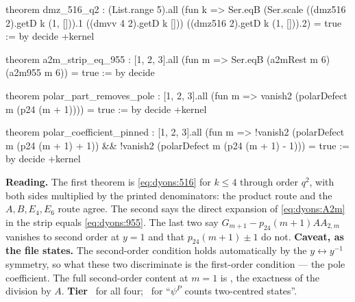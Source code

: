 \begin{leanbox}
\begin{leancode}
theorem dmz_516_q2 :
    (List.range 5).all (fun k =>
      Ser.eqB (Ser.scale ((dmz516 2).getD k (1, [])).1 ((dmvv 4 2).getD k []))
        ((dmz516 2).getD k (1, [])).2) = true := by decide +kernel

theorem a2m_strip_eq_955 :
    [1, 2, 3].all (fun m => Ser.eqB (a2mRest m 6) (a2m955 m 6)) = true := by
  decide

theorem polar_part_removes_pole :
    [1, 2, 3].all (fun m => vanish2 (polarDefect m (p24 (m + 1)))) = true := by
  decide +kernel

theorem polar_coefficient_pinned :
    [1, 2, 3].all (fun m => !vanish2 (polarDefect m (p24 (m + 1) + 1)) &&
      !vanish2 (polarDefect m (p24 (m + 1) - 1))) = true := by decide +kernel
\end{leancode}
\textbf{Reading.} The first theorem is \eqref{eq:dyons:516} for $k\le4$ through order $q^2$,
with both sides multiplied by the printed denominators: the product route and the
$A,B,E_4,E_6$ route agree. The second says the direct expansion of \eqref{eq:dyons:A2m} in the
strip equals \eqref{eq:dyons:955}. The last two say $G_{m+1}-p_{24}(m+1)AA_{2,m}$ vanishes to
second order at $y=1$ and that $p_{24}(m+1)\pm1$ do not. \textbf{Caveat, as the file states.}
The second-order condition holds automatically by the $y\leftrightarrow y^{-1}$ symmetry, so
what these two discriminate is the first-order condition --- the pole coefficient. The full
second-order content at $m=1$ is , the exactness of the division by
$A$. \textbf{Tier} \TA\ for all four; \TL\ for ``$\psi^P$ counts two-centred states''.
\end{leanbox}

